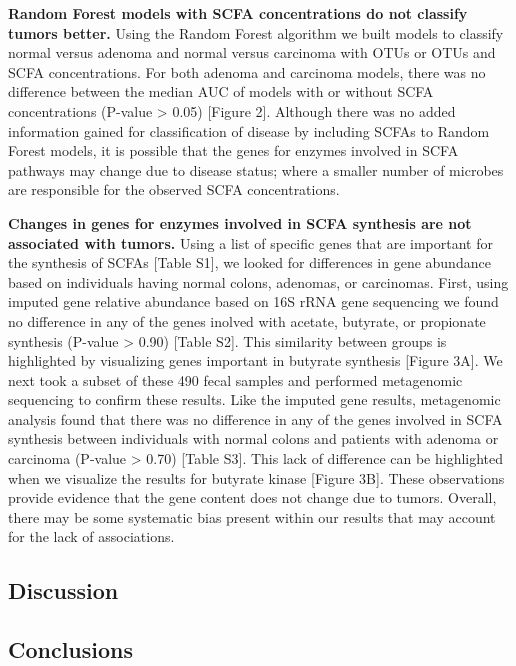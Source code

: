 \documentclass[11pt,]{article}
\begin{document}
\textbf{Random Forest models with SCFA concentrations do not classify
tumors better.} Using the Random Forest algorithm we built models to
classify normal versus adenoma and normal versus carcinoma with OTUs or
OTUs and SCFA concentrations. For both adenoma and carcinoma models,
there was no difference between the median AUC of models with or without
SCFA concentrations (P-value \textgreater{} 0.05) {[}Figure 2{]}.
Although there was no added information gained for classification of
disease by including SCFAs to Random Forest models, it is possible that
the genes for enzymes involved in SCFA pathways may change due to
disease status; where a smaller number of microbes are responsible for
the observed SCFA concentrations.

\textbf{Changes in genes for enzymes involved in SCFA synthesis are not
associated with tumors.} Using a list of specific genes that are
important for the synthesis of SCFAs {[}Table S1{]}, we looked for
differences in gene abundance based on individuals having normal colons,
adenomas, or carcinomas. First, using imputed gene relative abundance
based on 16S rRNA gene sequencing we found no difference in any of the
genes inolved with acetate, butyrate, or propionate synthesis (P-value
\textgreater{} 0.90) {[}Table S2{]}. This similarity between groups is
highlighted by visualizing genes important in butyrate synthesis
{[}Figure 3A{]}. We next took a subset of these 490 fecal samples and
performed metagenomic sequencing to confirm these results. Like the
imputed gene results, metagenomic analysis found that there was no
difference in any of the genes involved in SCFA synthesis between
individuals with normal colons and patients with adenoma or carcinoma
(P-value \textgreater{} 0.70) {[}Table S3{]}. This lack of difference
can be highlighted when we visualize the results for butyrate kinase
{[}Figure 3B{]}. These observations provide evidence that the gene
content does not change due to tumors. Overall, there may be some
systematic bias present within our results that may account for the lack
of associations.

\newpage

\subsection{Discussion}\label{discussion}

\newpage

\subsection{Conclusions}\label{conclusions}
\end{document}
